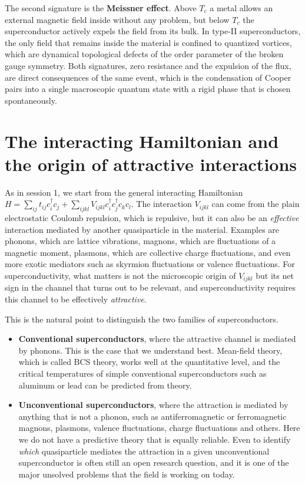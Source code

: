 The second signature is the \textbf{Meissner effect}. Above $T_c$ a metal allows an external
magnetic field inside without any problem, but below $T_c$ the superconductor actively expels the
field from its bulk. In type-II superconductors, the only field that remains inside the material is
confined to quantized vortices, which are dynamical topological defects of the order parameter of
the broken gauge symmetry. Both signatures, zero resistance and the expulsion of the flux, are
direct consequences of the same event, which is the condensation of Cooper pairs into a single
macroscopic quantum state with a rigid phase that is chosen spontaneously.

\section{The interacting Hamiltonian and the origin of attractive interactions}

As in session 1, we start from the general interacting Hamiltonian $H = \sum_{ij}t_{ij}c_i^\dagger
c_j + \sum_{ijkl}V_{ijkl}c_i^\dagger c_j^\dagger c_k c_l$. The interaction $V_{ijkl}$ can come from
the plain electrostatic Coulomb repulsion, which is repulsive, but it can also be an
\emph{effective} interaction mediated by another quasiparticle in the material. Examples are
phonons, which are lattice vibrations, magnons, which are fluctuations of a magnetic moment,
plasmons, which are collective charge fluctuations, and even more exotic mediators such as skyrmion
fluctuations or valence fluctuations. For superconductivity, what matters is not the microscopic
origin of $V_{ijkl}$ but its net sign in the channel that turns out to be relevant, and
superconductivity requires this channel to be effectively \emph{attractive}.

This is the natural point to distinguish the two families of superconductors.

\begin{itemize}
\item \textbf{Conventional superconductors}, where the attractive channel is mediated by phonons.
  This is the case that we understand best. Mean-field theory, which is called BCS theory, works
  well at the quantitative level, and the critical temperatures of simple conventional
  superconductors such as aluminum or lead can be predicted from theory.
\item \textbf{Unconventional superconductors}, where the attraction is mediated by anything that is
  not a phonon, such as antiferromagnetic or ferromagnetic magnons, plasmons, valence fluctuations,
  charge fluctuations and others. Here we do not have a predictive theory that is equally reliable.
  Even to identify \emph{which} quasiparticle mediates the attraction in a given unconventional
  superconductor is often still an open research question, and it is one of the major unsolved
  problems that the field is working on today.
\end{itemize}

